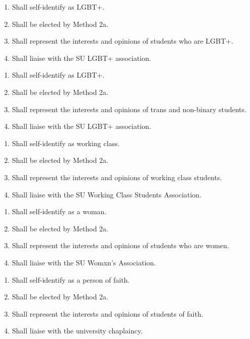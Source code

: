 \begin{enumerate}
    \item Shall self-identify as LGBT+. 
    \item Shall be elected by Method 2a. 
    \item Shall represent the interests and opinions of students who are LGBT+.  
    \item Shall liaise with the SU LGBT+ association.  
\end{enumerate}

\begin{enumerate}
    \item Shall self-identify as LGBT+. 
    \item Shall be elected by Method 2a. 
    \item Shall represent the interests and opinions of trans and non-binary students. 
    \item Shall liaise with the SU LGBT+ association.  
\end{enumerate}

\begin{enumerate}
    \item Shall self-identify as working class. 
    \item Shall be elected by Method 2a. 
    \item Shall represent the interests and opinions of working class students. 
    \item Shall liaise with the SU Working Class Students Association. 
\end{enumerate}

\begin{enumerate}
    \item Shall self-identify as a woman. \item Shall be elected by Method 2a. 
    \item Shall represent the interests and opinions of students who are women. 
    \item Shall liaise with the SU Womxn’s Association. 
\end{enumerate}

\begin{enumerate}
    \item Shall self-identify as a person of faith. 
    \item Shall be elected by Method 2a.
    \item Shall represent the interests and opinions of students of faith. 
    \item Shall liaise with the university chaplaincy. 
\end{enumerate}

